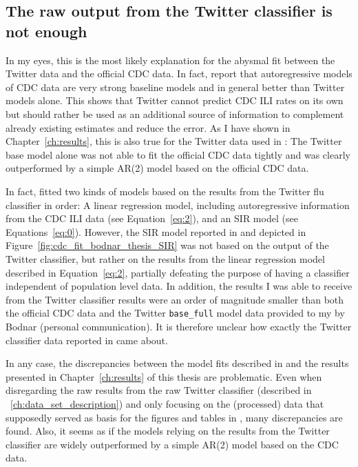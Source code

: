 \documentclass[11pt, a4paper,twoside]{report}\usepackage[]{graphicx}\usepackage[]{color}
\begin{document}
\subsection{The raw output from the Twitter classifier is not enough}
In my eyes, this is the most likely explanation for the abysmal fit between the Twitter data and the official CDC data. In fact, \citep{paul_worldwide_2015} report that autoregressive models of CDC data are very strong baseline models and in general better than Twitter models alone. This shows that Twitter cannot predict CDC ILI rates on its own but should rather be used as an additional source of information to complement already existing estimates and reduce the error. As I have shown in Chapter~\ref{ch:results}, this is also true for the Twitter data used in \citep{bodnar_data_2015}: The Twitter base model alone was not able to fit the official CDC data tightly and was clearly outperformed by a simple AR(2) model based on the official CDC data. 

In fact, \citep{bodnar_data_2015} fitted two kinds of models based on the results from the Twitter flu classifier in order: A linear regression model, including autoregressive information from the CDC ILI data (see Equation~\ref{eq:2}), and an SIR model (see Equations~\ref{eq:0}). However, the SIR model reported in \cite{bodnar_data_2015} and depicted in Figure~\ref{fig:cdc_fit_bodnar_thesis_SIR} was not based on the output of the Twitter classifier, but rather on the results from the linear regression model described in Equation~\ref{eq:2}, partially defeating the purpose of having a classifier independent of population level data. In addition, the results I was able to receive from the Twitter classifier results were an order of magnitude smaller than both the official CDC data and the Twitter \texttt{base\_full} model data provided to my by Bodnar (personal communication). It is therefore unclear how exactly the Twitter classifier data reported in \cite{bodnar_data_2015} came about. 

In any case, the discrepancies between the model fits described in \citep{bodnar_data_2015} and the results presented in Chapter~\ref{ch:results} of this thesis are problematic. Even when disregarding the raw results from the raw Twitter classifier (described in ~\ref{ch:data_set_description}) and only focusing on the (processed) data that supposedly served as basis for the figures and tables in \cite{bodnar_data_2015}, many discrepancies are found. Also, it seems as if the models relying on the results from the Twitter classifier are widely outperformed by a simple AR(2) model based on the CDC data.
\end{document}
